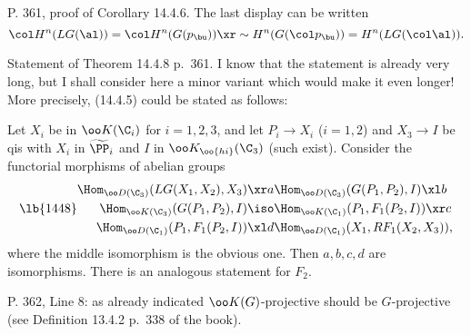 \documentclass[12pt]{article}
\theoremstyle{remark}
\theoremstyle{definition}
\begin{document}
%

\begin{s}
P. 361, proof of Corollary 14.4.6. The last display can be written
$$
\col H^n(LG(\al))=\col H^n(G(p_\bu))\xr\sim H^n(G(\col p_\bu))=H^n(LG(\col\al)).
$$
\end{s}

%

\begin{s}%
Statement of Theorem 14.4.8 p.~361. I know that the statement is already very long, but I shall consider here a minor variant which would make it even longer! More precisely, (14.4.5) could be stated as follows:

Let $X_i$ be in $\oo K(\C_i)$ for $i=1,2,3$, and let $P_i\to X_i$ ($i=1,2$) and $X_3\to I$ be qis with $X_i$ in $\widetilde\PP_i$ and $I$ in $\oo K_{\oo{hi}}(\C_3)$ (such exist). Consider the functorial morphisms of abelian groups
\begin{equation}\lb{1448}
\begin{split}
\Hom_{\oo D(\C_3)}(LG(X_1,X_2),X_3)&\xr a\Hom_{\oo D(\C_3)}(G(P_1,P_2),I)\xl b\\ 
\Hom_{\oo K(\C_3)}(G(P_1,P_2),I)&\iso\Hom_{\oo K(\C_1)}(P_1,F_1(P_2,I))\xr c\\ 
\Hom_{\oo D(\C_1)}(P_1,F_1(P_2,I))&\xl d\Hom_{\oo D(\C_1)}(X_1,RF_1(X_2,X_3)),
\end{split}
\end{equation}
where the middle isomorphism is the obvious one. Then $a,b,c,d$ are isomorphisms. There is an analogous statement for $F_2$.
\end{s}

%

\begin{s}
P. 362, Line 8: as already indicated $\oo K(G)$-projective should be $G$-projective (see Definition 13.4.2 p.~338 of the book).
\end{s}

%
\end{document}
